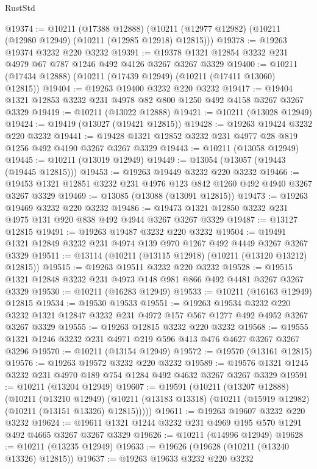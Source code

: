 \begin{lexlean}{RustStd}
\begin{coremodule}
{\begin{coremodule}
{{{{{{{{{{{{{{{{{{{{{{{{{@19374 := @10211
    (@17388 @12888)
    (@10211 (@12977 @12982) (@10211 (@12980 @12949) (@10211 (@12985 @12918) @12815)))
@19378 := @19263 @19374 @3232 @220 @3232
@19391 := @19378 @1321 @12854 @3232 @231 @4979 @67 @787 @1246 @492 @4126 @3267 @3267 @3329
@19400 := @10211 (@17434 @12888) (@10211 (@17439 @12949) (@10211 (@17411 @13060) @12815))
@19404 := @19263 @19400 @3232 @220 @3232
@19417 := @19404 @1321 @12853 @3232 @231 @4978 @82 @800 @1250 @492 @4158 @3267 @3267 @3329
@19419 := @10211 (@13022 @12888)
@19421 := @10211 (@13028 @12949)
@19424 := @19419 (@13027 (@19421 @12815))
@19428 := @19263 @19424 @3232 @220 @3232
@19441 := @19428 @1321 @12852 @3232 @231 @4977 @28 @819 @1256 @492 @4190 @3267 @3267 @3329
@19443 := @10211 (@13058 @12949)
@19445 := @10211 (@13019 @12949)
@19449 := @13054 (@13057 (@19443 (@19445 @12815)))
@19453 := @19263 @19449 @3232 @220 @3232
@19466 := @19453 @1321 @12851 @3232 @231 @4976 @123 @842 @1260 @492 @4940 @3267 @3267 @3329
@19469 := @13085 (@13088 (@13091 @12815))
@19473 := @19263 @19469 @3232 @220 @3232
@19486 := @19473 @1321 @12850 @3232 @231 @4975 @131 @920 @838 @492 @4944 @3267 @3267 @3329
@19487 := @13127 @12815
@19491 := @19263 @19487 @3232 @220 @3232
@19504 := @19491 @1321 @12849 @3232 @231 @4974 @139 @970 @1267 @492 @4449 @3267 @3267 @3329
@19511 := @13114 (@10211 (@13115 @12918) (@10211 (@13120 @13212) @12815))
@19515 := @19263 @19511 @3232 @220 @3232
@19528 := @19515 @1321 @12848 @3232 @231 @4973 @148 @981 @866 @492 @4481 @3267 @3267 @3329
@19530 := @10211 (@16283 @12949)
@19533 := @10211 (@16163 @12949) @12815
@19534 := @19530 @19533
@19551 := @19263
    @19534
    @3232
    @220
    @3232
    @1321
    @12847
    @3232
    @231
    @4972
    @157
    @567
    @1277
    @492
    @4952
    @3267
    @3267
    @3329
@19555 := @19263 @12815 @3232 @220 @3232
@19568 := @19555 @1321 @1246 @3232 @231 @4971 @219 @596 @413 @476 @4627 @3267 @3267 @3296
@19570 := @10211 (@13154 @12949)
@19572 := @19570 (@13161 @12815)
@19576 := @19263 @19572 @3232 @220 @3232
@19589 := @19576 @1321 @1245 @3232 @231 @4970 @189 @754 @1284 @492 @4632 @3267 @3267 @3329
@19591 := @10211 (@13204 @12949)
@19607 := @19591
    (@10211
      (@13207 @12888)
      (@10211
        (@13210 @12949)
        (@10211 (@13183 @13318) (@10211 (@15919 @12982) (@10211 (@13151 @13326) @12815)))))
@19611 := @19263 @19607 @3232 @220 @3232
@19624 := @19611 @1321 @1244 @3232 @231 @4969 @195 @570 @1291 @492 @4665 @3267 @3267 @3329
@19626 := @10211 (@14996 @12949)
@19628 := @10211 (@13235 @12949)
@19633 := @19626 (@19628 (@10211 (@13240 @13326) @12815))
@19637 := @19263 @19633 @3232 @220 @3232
}}}}}}}}}}}}}}}}}}}}}}}}}
\end{coremodule}}
\end{coremodule}
\end{lexlean}
